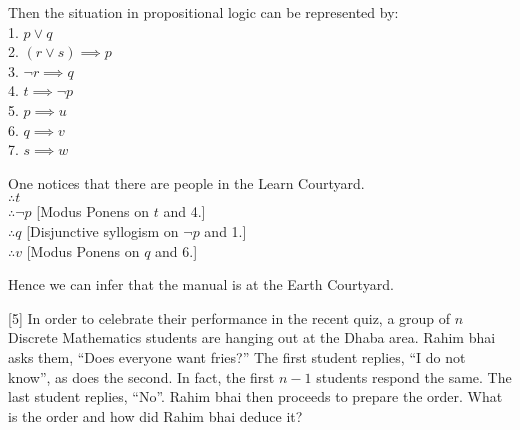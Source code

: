 \documentclass[a4paper]{exam}
\begin{document}
\begin{questions}
\begin{solution}
    \vspace{3mm}
    Then the situation in propositional logic can be represented by: \\
    \hspace*{2mm}1. $ p \lor q $ \\ 
    \hspace*{2mm}2. $ (r \lor s) \implies p $ \\ 
    \hspace*{2mm}3. $ \neg r \implies q $ \\ 
    \hspace*{2mm}4. $ t \implies \neg p $ \\ 
    \hspace*{2mm}5. $ p \implies u $ \\ 
    \hspace*{2mm}6. $ q \implies v $ \\ 
    \hspace*{2mm}7. $ s \implies w $

    \vspace{3mm}
    One notices that there are people in the Learn Courtyard. \\ 
    $ \therefore t $ \\ 
    $ \therefore \neg p $ [Modus Ponens on $t$ and 4.] \\ 
    $ \therefore q $ [Disjunctive syllogism on $ \neg p $ and 1.] \\ 
    $ \therefore v $ [Modus Ponens on $q$ and 6.] 

    Hence we can infer that the manual is at the Earth Courtyard.
     
  \end{solution}

  [5] In order to celebrate their performance in the recent quiz, a group of $n$ Discrete Mathematics students are hanging out at the Dhaba area. Rahim bhai asks them, ``Does everyone want fries?'' The first student replies, ``I do not know'', as does the second. In fact, the first $n-1$ students respond the same. The last student replies, ``No''. Rahim bhai then proceeds to prepare the order. What is the order and how did Rahim bhai deduce it?

  \begin{solution}
    

\end{solution}
\end{questions}
\end{document}
